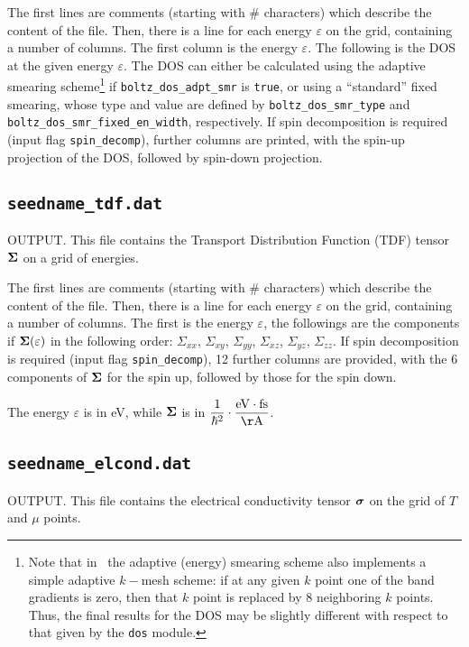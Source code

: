 The first lines are comments (starting with \# characters) which describe the content of the file.
Then, there is a line for each energy $\varepsilon$ on the grid, containing a number of columns. The first column is the energy $\varepsilon$. The following is the DOS at the given energy $\varepsilon$.
The DOS can either be calculated using the adaptive smearing scheme\footnote{%
Note that in \bw\ the adaptive (energy) smearing scheme also implements a simple adaptive $k-$mesh scheme:
if at any given $k$ point one of the band gradients is zero, then that $k$ point is replaced by 8 neighboring $k$ points. Thus, the final results for the DOS may be slightly different with respect to that given by the {\tt dos} module.} if {\tt boltz\_dos\_adpt\_smr} is \verb#true#, or using a ``standard'' fixed smearing, whose type and value are defined by {\tt boltz\_dos\_smr\_type} and {\tt boltz\_dos\_smr\_fixed\_en\_width}, respectively.
If spin decomposition is required (input flag {\tt spin\_decomp}), further columns are printed, with the spin-up projection of the DOS, followed by spin-down projection.

\subsection{{\tt seedname\_tdf.dat}}
OUTPUT. This file contains the Transport Distribution Function (TDF) tensor $\bm{\mathrm{\Sigma}}$ on a grid of energies. 

The first lines are comments (starting with \# characters) which describe the content of the file.
Then, there is a line for each energy $\varepsilon$ on the grid, containing a number of columns. The first is the energy $\varepsilon$, the followings are the components if $\bm{\mathrm{\Sigma}}(\varepsilon)$ in the following order: $\Sigma_{xx}$, $\Sigma_{xy}$, $\Sigma_{yy}$, $\Sigma_{xz}$, $\Sigma_{yz}$, $\Sigma_{zz}$. If spin decomposition is required (input flag {\tt spin\_decomp}), 12 further columns are provided, with the 6 components of $\bm{\mathrm{\Sigma}}$ for the spin up, followed by those for the spin down.

The energy $\varepsilon$ is in eV, while $\bm{\mathrm{\Sigma}}$ is in 
 $\displaystyle\frac{1}{\hbar^2}\cdot\frac{\mathrm{eV}\cdot\mathrm{fs}}{\mathrm{\AA}}$.

\subsection{{\tt seedname\_elcond.dat}}
OUTPUT. This file contains the electrical conductivity tensor $\bm{\mathrm{\sigma}}$ on the grid of $T$ and $\mu$ points. 

